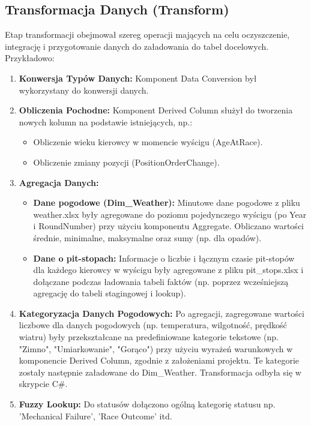 \documentclass[a4paper,12pt]{article}
\begin{document}
\subsection{Transformacja Danych (Transform)}
Etap transformacji obejmował szereg operacji mających na celu oczyszczenie, integrację i przygotowanie danych do załadowania do tabel docelowych. Przykładowo:
\begin{enumerate}
  \item \textbf{Konwersja Typów Danych:} Komponent Data Conversion był wykorzystany do konwersji danych.
  \item \textbf{Obliczenia Pochodne:} Komponent Derived Column służył do tworzenia nowych kolumn na podstawie istniejących, np.:
        \begin{itemize}
          \item Obliczenie wieku kierowcy w momencie wyścigu (AgeAtRace).
          \item Obliczenie zmiany pozycji (PositionOrderChange).
        \end{itemize}
  \item \textbf{Agregacja Danych:}
        \begin{itemize}
          \item \textbf{Dane pogodowe (Dim\_Weather):} Minutowe dane pogodowe z pliku weather.xlsx były agregowane do poziomu pojedynczego wyścigu (po Year i RoundNumber) przy użyciu komponentu Aggregate. Obliczano wartości średnie, minimalne, maksymalne oraz sumy (np. dla opadów).
          \item \textbf{Dane o pit-stopach:} Informacje o liczbie i łącznym czasie pit-stopów dla każdego kierowcy w wyścigu były agregowane z pliku pit\_stops.xlsx i dołączane podczas ładowania tabeli faktów (np. poprzez wcześniejszą agregację do tabeli stagingowej i lookup).
        \end{itemize}
  \item \textbf{Kategoryzacja Danych Pogodowych:} Po agregacji, zagregowane wartości liczbowe dla danych pogodowych (np. temperatura, wilgotność, prędkość wiatru) były przekształcane na predefiniowane kategorie
        tekstowe (np. "Zimno", "Umiarkowanie", "Gorąco") przy użyciu wyrażeń warunkowych w komponencie Derived Column, zgodnie z założeniami projektu. Te kategorie zostały następnie załadowane do Dim\_Weather. Transformacja odbyła się w skrypcie C\#.
  \item \textbf{Fuzzy Lookup:} Do statusów dołączono ogólną kategorię statusu np. 'Mechanical Failure', 'Race Outcome' itd.
\end{enumerate}
\end{document}
